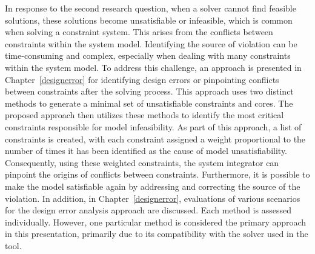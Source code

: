 	
	In response to the second research question, when a solver cannot find feasible solutions, these solutions become unsatisfiable or infeasible, which is common when solving a constraint system.
	This arises from the conflicts between constraints within the system model.
	Identifying the source of violation can be time-consuming and complex, especially when dealing with many constraints within the system model. To address this challenge, an approach is presented in Chapter~\ref{designerror} for identifying design errors or pinpointing conflicts between constraints after the solving process. This approach uses two distinct methods to generate a minimal set of unsatisfiable constraints and cores. 
	The proposed approach then utilizes these methods to identify the most critical constraints responsible for model infeasibility.  As part of this approach, a list of constraints is created, with each constraint assigned a weight proportional to the number of times it has been identified as the cause of model unsatisfiability.
	Consequently, using these weighted constraints, the system integrator can pinpoint the origins of conflicts between constraints. Furthermore, it is possible to make the model satisfiable again by addressing and correcting the source of the violation.
	In addition, in Chapter~\ref{designerror}, evaluations of various scenarios for the design error analysis approach are discussed. Each method is assessed individually. However, one particular method is considered the primary approach in this presentation, primarily due to its compatibility with the solver used in the tool. 
	
